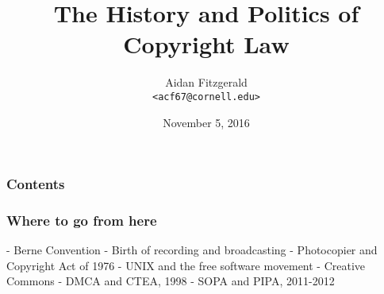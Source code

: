 \documentclass{beamer}
\title{The History and Politics of Copyright Law}
\author{
Aidan Fitzgerald \\
\texttt{<acf67@cornell.edu>}
}
\date{November 5, 2016}
\begin{document}

\begin{frame}
  \titlepage
\end{frame}



\begin{frame}
  \frametitle{Contents}
  \tableofcontents
\end{frame}







\begin{frame}
  \frametitle{Where to go from here}

  - Berne Convention
  - Birth of recording and broadcasting
  - Photocopier and Copyright Act of 1976
  - UNIX and the free software movement
  - Creative Commons
  - DMCA and CTEA, 1998
  - SOPA and PIPA, 2011-2012
\end{frame}
\end{document}
